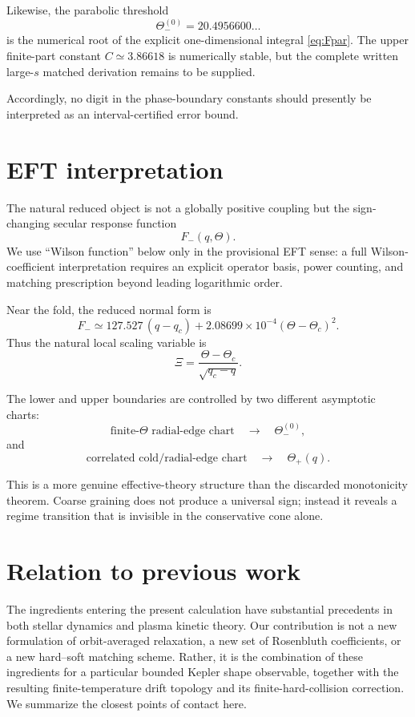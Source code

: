 \documentclass[11pt]{article}
\theoremstyle{remark}
\newcommand{\1}{\mathbf 1}
\begin{document}
Likewise, the parabolic threshold
\[
\Theta_-^{(0)}=20.4956600\ldots
\]
is the numerical root of the explicit one-dimensional integral
\eqref{eq:Fpar}.  The upper finite-part constant \(C\simeq3.86618\) is
numerically stable, but the complete written large-\(s\) matched derivation
remains to be supplied.

Accordingly, no digit in the phase-boundary constants should presently be
interpreted as an interval-certified error bound.

\section{EFT interpretation}

The natural reduced object is not a globally positive coupling but the
sign-changing secular response function
\[
F_-(q,\Theta).
\]
We use ``Wilson function'' below only in the provisional EFT sense: a full
Wilson-coefficient interpretation requires an explicit operator basis,
power counting, and matching prescription beyond leading logarithmic order.

Near the fold, the reduced normal form is
\[
F_-
\simeq
127.527\,(q-q_c)
+
2.08699\times10^{-4}
(\Theta-\Theta_c)^2.
\]
Thus the natural local scaling variable is
\[
\boxed{
\Xi
=
\frac{\Theta-\Theta_c}{\sqrt{q_c-q}}.
}
\]

The lower and upper boundaries are controlled by two different asymptotic
charts:
\[
\text{finite-}\Theta\text{ radial-edge chart}
\quad\longrightarrow\quad
\Theta_-^{(0)},
\]
and
\[
\text{correlated cold/radial-edge chart}
\quad\longrightarrow\quad
\Theta_+(q).
\]

This is a more genuine effective-theory structure than the discarded
monotonicity theorem.  Coarse graining does not produce a universal sign;
instead it reveals a regime transition that is invisible in the conservative
cone alone.

\section{Relation to previous work}
\label{sec:related-work}

The ingredients entering the present calculation have substantial precedents
in both stellar dynamics and plasma kinetic theory.  Our contribution is not
a new formulation of orbit-averaged relaxation, a new set of Rosenbluth
coefficients, or a new hard--soft matching scheme.  Rather, it is the
combination of these ingredients for a particular bounded Kepler shape
observable, together with the resulting finite-temperature drift topology and
its finite-hard-collision correction.  We summarize the closest points of
contact here.
\end{document}
